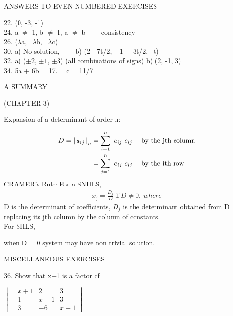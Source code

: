 \documentclass{book}
\begin{document}
\centerline{ANSWERS TO EVEN NUMBERED EXERCISES} 
\begin{flushleft}
22. (0, -3, -1)\\
24. a $\neq$ 1, b $\neq$ 1, a $\neq$ b \ \ \ \ consistency\\
26. ($\lambda$a, \ $\lambda$b, \ $\lambda$c)\\
30. a) No solution, \ \ \ \ b) (2 - 7t/2, \ -1 + 3t/2, \ t)\\
32. a) ($\pm2$, $\pm1$, $\pm3$) (all combinations of signs) b) (2, -1, 3) \\
34. 5a + 6b = 17, \ \ c = 11/7 \\
\end{flushleft}

\centerline{A SUMMARY}
\centerline{(CHAPTER 3)}
\begin{framed}
\begin{flushleft}
Expansion of a determinant of order n:
\end{flushleft}
\begin{align*}
D = \left \lvert \, a_{ij} \, \right \rvert_{n}
& = \sum_{i = 1}^n \ a_{ij} \ c_{ij} \ \ \ \ \text{by the jth column} \\
& = \sum_{j = 1}^n \ a_{ij} \ c_{ij} \ \ \ \ \text{by the ith row} \\
\end{align*}
CRAMER's Rule: For a SNHLS,
\begin{align*}
    x_{j} = \frac{D_{j}}{D} \ \text{if} \ D \neq 0,\ where
\end{align*}
D is the determinant of coefficients, $D_{j}$ is the determinant obtained from D replacing its jth column by the column of constants.\\
For SHLS,\\
\centerline{when D = 0 system may have non trivial solution.}
\end{framed}
\centerline{MISCELLANEOUS EXERCISES}
\begin{flushleft}
36. Show that x+1 is a factor of
\end{flushleft}

\centerline{$\begin{vmatrix}
 &x+1 &2 &3 \\
 &1 &x+1 &3 \\
 &3 &-6 &x+1 
\end{vmatrix}$}
\end{document}
